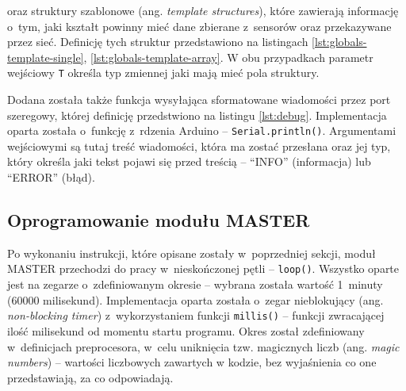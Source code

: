 

oraz struktury szablonowe (ang. \textsl{template structures}), które zawierają informację o~tym, jaki kształt powinny
mieć dane zbierane z~sensorów oraz przekazywane przez sieć. Definicję tych struktur przedstawiono na listingach
\ref{lst:globals-template-single}, \ref{lst:globals-template-array}. W obu przypadkach parametr wejściowy \texttt{T}
określa typ zmiennej jaki mają mieć pola struktury.





\FloatBarrier
Dodana została także funkcja wysyłająca sformatowane wiadomości przez port szeregowy, której definicję przedstwiono na
listingu \ref{lst:debug}. Implementacja oparta została o~funkcję z~rdzenia Arduino -- \texttt{Serial.println()}.
Argumentami wejściowymi są tutaj treść wiadomości, która ma zostać przesłana oraz jej typ, który określa jaki tekst
pojawi się przed treścią -- \enquote{INFO} (informacja) lub \enquote{ERROR} (błąd).



\FloatBarrier
\subsection{Oprogramowanie modułu MASTER\label{sect:firmware-master}} Po wykonaniu instrukcji, które
opisane zostały w~poprzedniej sekcji, moduł MASTER przechodzi do pracy w~nieskończonej pętli -- \texttt{loop()}.
Wszystko oparte jest na zegarze o~zdefiniowanym okresie -- wybrana została wartość 1~minuty (60000 milisekund).
Implementacja oparta została o~zegar nieblokujący (ang. \textsl{non-blocking timer}) z~wykorzystaniem funkcji
\texttt{millis()} -- funkcji zwracającej ilość milisekund od momentu startu programu. Okres został zdefiniowany
w~definicjach preprocesora, w~celu uniknięcia tzw. magicznych liczb (ang. \textsl{magic numbers}) -- wartości liczbowych
zawartych w kodzie, bez wyjaśnienia co one przedstawiają, za co odpowiadają.

